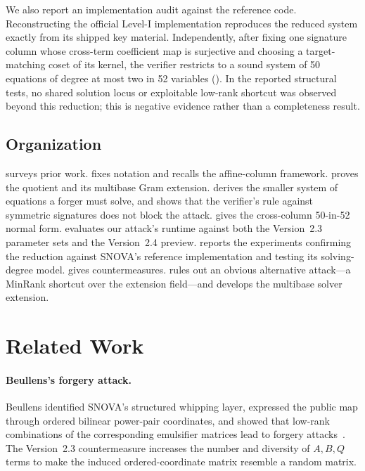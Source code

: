 \documentclass[11pt]{article}
\newcommand{\SNOVA}{\textsf{SNOVA}}
\begin{document}
We also report an implementation audit against the reference code.  Reconstructing the official Level-I implementation reproduces the reduced system exactly from its shipped key material.  Independently, after fixing one signature column whose cross-term coefficient map is surjective and choosing a target-matching coset of its kernel, the verifier restricts to a sound system of 50 equations of degree at most two in 52 variables ().  In the reported structural tests, no shared solution locus or exploitable low-rank shortcut was observed beyond this reduction; this is negative evidence rather than a completeness result.

\subsection{Organization}

 surveys prior work.   fixes notation and recalls the affine-column framework.   proves the quotient and its multibase Gram extension.   derives the smaller system of equations a forger must solve, and  shows that the verifier's rule against symmetric signatures does not block the attack.   gives the cross-column 50-in-52 normal form.   evaluates our attack's runtime against both the Version~2.3 parameter sets and the Version~2.4 preview.   reports the experiments confirming the reduction against \SNOVA{}'s reference implementation and testing its solving-degree model.   gives countermeasures.   rules out an obvious alternative attack---a MinRank shortcut over the extension field---and  develops the multibase solver extension.

\section{Related Work}\label{sec:related}

\paragraph{Beullens's forgery attack.}
Beullens identified \SNOVA{}'s structured whipping layer, expressed the public map through ordered bilinear power-pair coordinates, and showed that low-rank combinations of the corresponding emulsifier matrices lead to forgery attacks~\cite{Beullens2024SNOVA}.  The Version~2.3 countermeasure increases the number and diversity of $A,B,Q$ terms to make the induced ordered-coordinate matrix resemble a random matrix.
\end{document}
